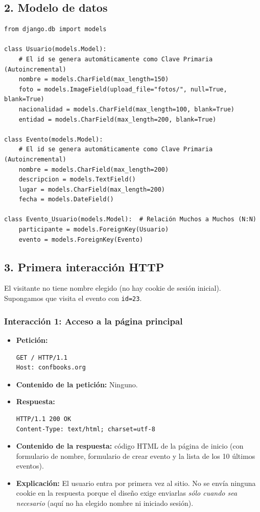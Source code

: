 \subsection*{2. Modelo de datos}

\begin{verbatim}
from django.db import models

class Usuario(models.Model):
    # El id se genera automáticamente como Clave Primaria (Autoincremental)
    nombre = models.CharField(max_length=150)
    foto = models.ImageField(upload_file="fotos/", null=True, blank=True)
    nacionalidad = models.CharField(max_length=100, blank=True)
    entidad = models.CharField(max_length=200, blank=True)

class Evento(models.Model):
    # El id se genera automáticamente como Clave Primaria (Autoincremental)
    nombre = models.CharField(max_length=200)
    descripcion = models.TextField()
    lugar = models.CharField(max_length=200)
    fecha = models.DateField()

class Evento_Usuario(models.Model):  # Relación Muchos a Muchos (N:N)
    participante = models.ForeignKey(Usuario)
    evento = models.ForeignKey(Evento)
\end{verbatim}

\subsection*{3. Primera interacción HTTP}

El visitante no tiene nombre elegido (no hay cookie de sesión inicial). Supongamos que visita el evento con \texttt{id=23}.

\subsubsection*{Interacción 1: Acceso a la página principal}
\begin{itemize}
    \item \textbf{Petición:}
    \begin{verbatim}
GET / HTTP/1.1
Host: confbooks.org
    \end{verbatim}
    \item \textbf{Contenido de la petición:} Ninguno.
    \item \textbf{Respuesta:}
    \begin{verbatim}
HTTP/1.1 200 OK
Content-Type: text/html; charset=utf-8
    \end{verbatim}
    \item \textbf{Contenido de la respuesta:} código HTML de la página de inicio (con formulario de nombre, formulario de crear evento y la lista de los 10 últimos eventos).
    \item \textbf{Explicación:} El usuario entra por primera vez al sitio. No se envía ninguna cookie en la respuesta porque el diseño exige enviarlas \emph{sólo cuando sea necesario} (aquí no ha elegido nombre ni iniciado sesión).
\end{itemize}

